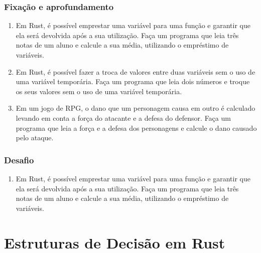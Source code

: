 \documentclass[12pt,a4paper,oneside]{abntex2}
\begin{document}
\subsection{Fixação e aprofundamento}
\begin{enumerate}
    \item Em Rust, é possível emprestar uma variável para uma função e garantir que ela será devolvida após a sua utilização. Faça um programa que leia três notas de um aluno e calcule a sua média, utilizando o empréstimo de variáveis.

    \item Em Rust, é possível fazer a troca de valores entre duas variáveis sem o uso de uma variável temporária. Faça um programa que leia dois números e troque os seus valores sem o uso de uma variável temporária.

    \item Em um jogo de RPG, o dano que um personagem causa em outro é calculado levando em conta a força do atacante e a defesa do defensor. Faça um programa que leia a força e a defesa dos personagens e calcule o dano causado pelo ataque.
\end{enumerate}
\subsection{Desafio}
\begin{enumerate}
    \item Em Rust, é possível emprestar uma variável para uma função e garantir que ela será devolvida após a sua utilização. Faça um programa que leia três notas de um aluno e calcule a sua média, utilizando o empréstimo de variáveis.

\end{enumerate}

\chapter{Estruturas de Decisão em Rust}
\end{document}
